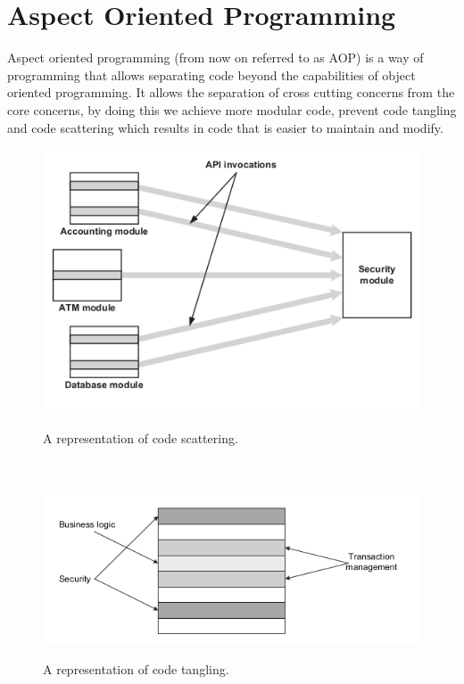 \documentclass[a4paper]{report}
\begin{document}
\section{Aspect Oriented Programming}
Aspect oriented programming (from now on referred to as AOP) is a way of programming that allows separating code beyond the capabilities of object oriented programming. It allows the separation of cross cutting concerns from the core concerns, by doing this we achieve more modular code, prevent code tangling and code scattering which results in code that is easier to maintain and modify.
\begin{figure}[h!]
\centering
\includegraphics[scale=0.5]{images/Code_Scattering.png}
\label{fig:Code_Scattering}
\caption{A representation of code scattering\cite{Laddad10}.}
\end{figure}\\
\begin{figure}[h!]
\centering
\includegraphics[scale=0.5]{images/Code_Tangling.png}
\label{fig:Code_Tangling}
\caption{A representation of code tangling\cite{Laddad10}.}
\end{figure}\\
\end{document}
